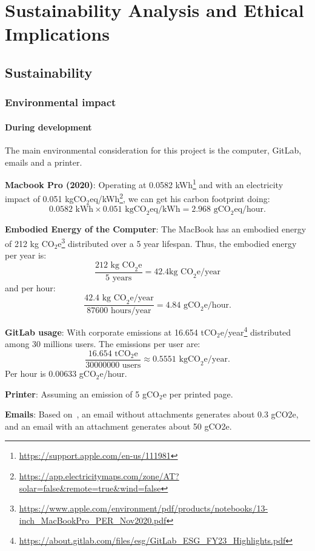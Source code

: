 \chapter{Sustainability Analysis and Ethical Implications}
\label{sec:sustainability}
\section*{Sustainability}
\subsection*{Environmental impact}
\subsubsection*{During development}
The main environmental consideration for this project is the computer, GitLab, emails and a printer.

\textbf{Macbook Pro (2020)}: Operating at 0.0582 kWh\footnote{\url{https://support.apple.com/en-us/111981}} and with an electricity impact of 0.051 kgCO$_2$eq/kWh\footnote{\url{https://app.electricitymaps.com/zone/AT?solar=false&remote=true&wind=false}}, we can get his carbon footprint doing: 
\[0.0582\text{ kWh}\times0.051\text{ kgCO}_2\text{eq/kWh}= 2.968\text{ gCO}_2\text{eq/hour}.\]

\textbf{Embodied Energy of the Computer}: The MacBook has an embodied energy of 212 kg CO$_2$e\footnote{\url{https://www.apple.com/environment/pdf/products/notebooks/13-inch_MacBookPro_PER_Nov2020.pdf}} distributed over a 5 year lifespan. Thus, the embodied energy per year is:
\[\frac{212 \text{ kg CO}_2\text{e}}{5\text{ years}}=42.4\text{kg CO}_2\text{e/year}\] 
and per hour:
\[\frac{42.4\text{ kg CO}_2\text{e/year}}{87600\text{ hours/year}}=4.84 \text{ gCO}_2\text{e/hour}.\]

\textbf{GitLab usage}: With corporate emissions at 16.654 tCO$_2$e/year\footnote{\url{https://about.gitlab.com/files/esg/GitLab_ESG_FY23_Highlights.pdf}} distributed among 30 millions users. The emissions per user are: 
\[\frac{16.654 \text{ tCO}_2\text{e}}{30000000\text{ users}}\approx0.5551\text{ kgCO}_2\text{e/year}.\]
Per hour is 0.00633 gCO$_2$e/hour.

\textbf{Printer}: Assuming an emission of 5 gCO$_2$e per printed page.

\textbf{Emails}: Based on~\cite{berners2020bad}, an email without attachments generates about 0.3 gCO2e, and an email with an attachment generates about 50 gCO2e.

